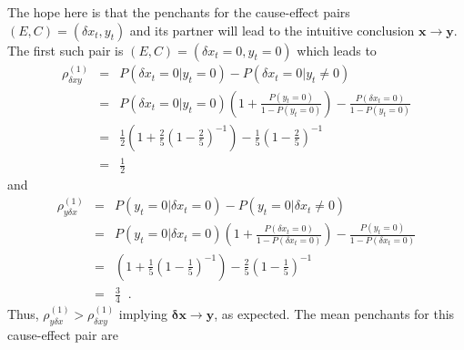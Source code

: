 \documentclass[a4paper,11pt]{article}
\begin{document}
The hope here is that the penchants for the cause-effect pairs $(E,C)=(\delta x_t,y_t)$ and its partner will lead to the intuitive conclusion $\mathbf{x}\rightarrow\mathbf{y}$.  The first such pair is $(E,C)=(\delta x_t=0,y_t=0)$ which leads to
\begin{eqnarray}
\rho_{\delta xy}^{(1)} &=& P(\delta x_t = 0 | y_t = 0) - P(\delta x_t = 0 | y_t \neq 0)\\
&=&  P(\delta x_t = 0 | y_t = 0)\left(1+\frac{P(y_t = 0)}{1-P(y_t = 0)}\right)-\frac{P(\delta x_t = 0)}{1-P(y_t = 0)}\\
&=& \frac{1}{2}\left(1+\frac{2}{5}\left(1-\frac{2}{5}\right)^{-1}\right)-\frac{1}{5}\left(1-\frac{2}{5}\right)^{-1}\\
&=& \frac{1}{2}
\end{eqnarray}
and
\begin{eqnarray}
\rho_{y\delta x}^{(1)} &=& P(y_t = 0 | \delta x_t = 0) - P(y_t = 0 | \delta x_t \neq 0)\\
&=& P(y_t = 0|\delta x_t = 0)\left(1+\frac{P(\delta x_t = 0)}{1-P(\delta x_t = 0)}\right)-\frac{P(y_t = 0)}{1-P(\delta x_t = 0)}\\
&=& \left(1+\frac{1}{5}\left(1-\frac{1}{5}\right)^{-1}\right)-\frac{2}{5}\left(1-\frac{1}{5}\right)^{-1}\\
&=& \frac{3}{4}\;\;.
\end{eqnarray}
Thus, $\rho_{y\delta x}^{(1)}>\rho_{\delta xy}^{(1)}$ implying $\mathbf{\delta x}\rightarrow\mathbf{y}$, as expected.  The mean penchants for this cause-effect pair are
\end{document}
